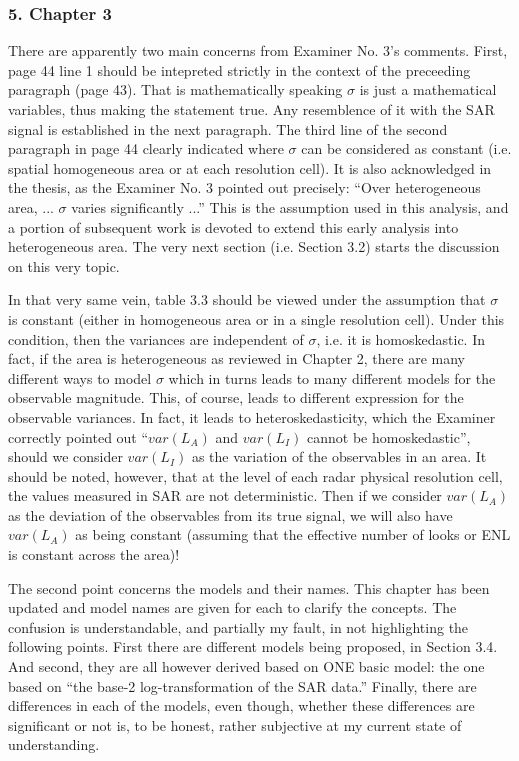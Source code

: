 \documentclass{article}
\begin{document}
\subsubsection*{5. Chapter 3}

There are apparently two main concerns from Examiner No. 3's comments.
First, page 44 line 1 should be intepreted strictly in the context of the preceeding paragraph (page 43). 
That is mathematically  speaking $\sigma$ is just a mathematical variables, thus making the statement true. 
Any resemblence of it with the SAR signal is established in the next paragraph.
The third line of the second paragraph in page 44 clearly indicated where $\sigma$ can be considered as constant (i.e. spatial homogeneous area or at each resolution cell).
It is also acknowledged in the thesis, as the Examiner No. 3 pointed out precisely: ``Over heterogeneous area, ... $\sigma$ varies significantly ...''
This is the assumption used in this analysis, 
  and a portion of subsequent work is devoted to extend this early analysis into heterogeneous area.
The very next section (i.e. Section 3.2) starts the discussion on this very topic.  

In that very same vein, table 3.3 should be viewed under the assumption that $\sigma$ is constant (either in homogeneous area or in a single resolution cell).
Under this condition, then the variances are independent of $\sigma$, i.e. it is homoskedastic.
In fact, if the area is heterogeneous as reviewed in Chapter 2, there are many different ways to model $\sigma$ which in turns leads to many different models for the observable magnitude.
This, of course, leads to different expression for the observable variances.
In fact, it leads to heteroskedasticity, which the Examiner correctly pointed out ``$var(L_A)$ and $var(L_I)$ cannot be homoskedastic'', should we consider $var(L_I)$ as the variation of the observables in an area.
It should be noted, however, that at the level of each radar physical resolution cell, the values measured in SAR are not deterministic.
Then if we consider $var(L_A)$ as the deviation of the observables from its true signal, we will also have $var(L_A)$ as being constant (assuming that the effective number of looks or ENL is constant across the area)!

The second point concerns the models and their names.
This chapter has been updated and model names are given for each to clarify the concepts.
The confusion is understandable, and partially my fault, in not highlighting the following points.
First there are different models being proposed, in Section 3.4.
And second, they are all however derived based on ONE basic model: the one based on ``the base-2 log-transformation of the SAR data.''
Finally, there are differences in each of the models, even though, whether these differences are significant or not is, to be honest, rather subjective at my current state of understanding.
\end{document}
